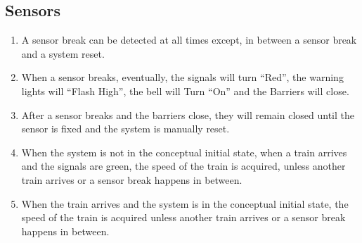 \documentclass[10pt,a4paper]{article}
\begin{document}
\subsection{Sensors}
\begin{enumerate}
\item A sensor break can be detected at all times except, in between a sensor break and a system reset.
\item When a sensor breaks, eventually, the signals will turn ``Red'', the warning lights will ``Flash High'', the bell will Turn ``On'' and the Barriers will close.
\item After a sensor breaks and the barriers close, they will remain closed until the sensor is fixed and the system is manually reset.
\item When the system is not in the conceptual initial state, when a train arrives and the signals are green, the speed of the train is acquired, unless another train arrives or a sensor break happens in between.
\item When the train arrives and the system is in the conceptual initial state, the speed of the train is acquired unless another train arrives or a sensor break happens in between.

\end{enumerate}
\end{document}
